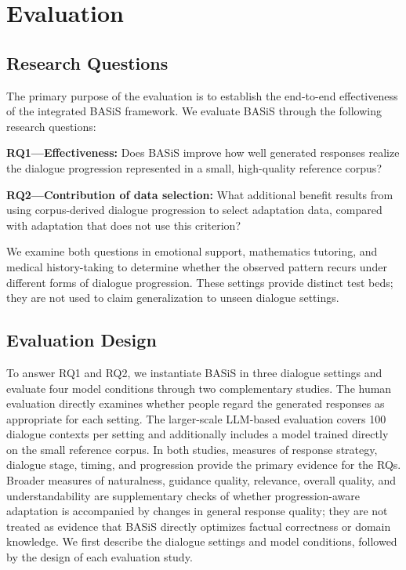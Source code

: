 \documentclass[manuscript,review,anonymous]{acmart}
\begin{document}
\section{Evaluation}
\label{sec:evaluation}
\label{sec:setup}

\subsection{Research Questions}
\label{sec:eval_objectives}
The primary purpose of the evaluation is to establish the end-to-end effectiveness of the integrated BASiS framework. 
We evaluate BASiS through the following research questions:

\noindent\textbf{RQ1---Effectiveness:} Does BASiS improve how well generated responses realize the dialogue progression represented in a small, high-quality reference corpus?

\noindent\textbf{RQ2---Contribution of data selection:} What additional benefit results from using corpus-derived dialogue progression to select adaptation data, compared with adaptation that does not use this criterion?

We examine both questions in emotional support, mathematics tutoring, and medical history-taking to determine whether the observed pattern recurs under different forms of dialogue progression. These settings provide distinct test beds; they are not used to claim generalization to unseen dialogue settings.

\subsection{Evaluation Design}
\label{sec:eval_methodology}

To answer RQ1 and RQ2, we instantiate BASiS in three dialogue settings and evaluate four model conditions through two complementary studies. The human evaluation directly examines whether people regard the generated responses as appropriate for each setting. The larger-scale LLM-based evaluation covers 100 dialogue contexts per setting and additionally includes a model trained directly on the small reference corpus. In both studies, measures of response strategy, dialogue stage, timing, and progression provide the primary evidence for the RQs. Broader measures of naturalness, guidance quality, relevance, overall quality, and understandability are supplementary checks of whether progression-aware adaptation is accompanied by changes in general response quality; they are not treated as evidence that BASiS directly optimizes factual correctness or domain knowledge. We first describe the dialogue settings and model conditions, followed by the design of each evaluation study.
\end{document}
